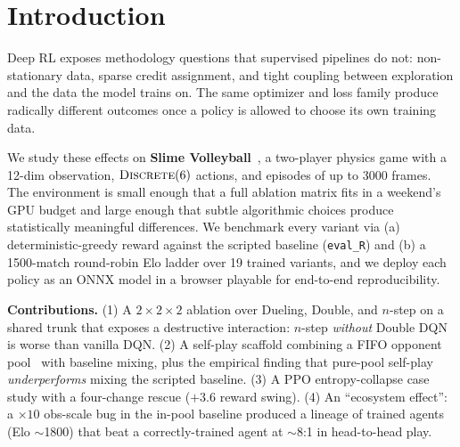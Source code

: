 \section{Introduction}

Deep RL exposes methodology questions that supervised pipelines do not:
non-stationary data, sparse credit assignment, and tight coupling
between exploration and the data the model trains on. The same
optimizer and loss family produce radically different outcomes once a
policy is allowed to choose its own training data.

We study these effects on \textbf{Slime
Volleyball}~\citep{slimevolleygym}, a two-player physics game with a
12-dim observation, $\textsc{Discrete}(6)$ actions, and episodes of up
to 3000 frames. The environment is small enough that a full ablation
matrix fits in a weekend's GPU budget and large enough that subtle
algorithmic choices produce statistically meaningful differences. We
benchmark every variant via (a) deterministic-greedy reward against the
scripted baseline (\texttt{eval\_R}) and (b) a 1500-match round-robin
Elo ladder over 19 trained variants, and we deploy each policy as an
ONNX model in a browser playable for end-to-end reproducibility.

\textbf{Contributions.} (1) A $2{\times}2{\times}2$ ablation over
Dueling, Double, and $n$-step on a shared trunk that exposes a
destructive interaction: $n$-step \emph{without} Double DQN is worse
than vanilla DQN. (2) A self-play scaffold combining a FIFO opponent
pool~\citep{silver2016alphago,vinyals2019alphastar} with baseline
mixing, plus the empirical finding that pure-pool self-play
\emph{underperforms} mixing the scripted baseline. (3) A PPO
entropy-collapse case study with a four-change rescue ($+3.6$ reward
swing). (4) An ``ecosystem effect'': a $\times 10$ obs-scale bug in the
in-pool baseline produced a lineage of trained agents (Elo $\sim$1800)
that beat a correctly-trained agent at $\sim$8:1 in head-to-head play.
